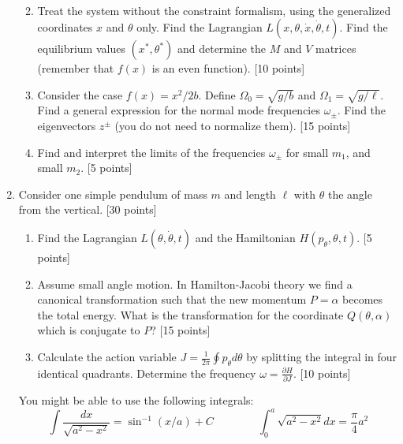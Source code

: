 \documentclass[letterpaper,11pt]{article}
\begin{document}
\begin{enumerate}
\begin{enumerate}
\begin{eqnarray*}
   \end{eqnarray*}

  \item Treat the system without the constraint formalism, using the generalized coordinates $x$ and $\theta$ only.  Find the Lagrangian $L(x,\theta,\dot{x},\dot{\theta},t)$.  Find the equilibrium values $(x^*,\theta^*)$ and determine the $M$ and $V$ matrices (remember that $f(x)$ is an even function). [10 points]
  \item Consider the case $f(x) = x^2/2b$.  Define $\Omega_0 = \sqrt{g/b}$ and $\Omega_1 = \sqrt{g/\ell}$.  Find a general expression for the normal mode frequencies $\omega_\pm$.  Find the eigenvectors $z^\pm$ (you do not need to normalize them). [15 points]
  \item Find and interpret the limits of the frequencies $\omega_\pm$ for small $m_1$, and small $m_2$. [5 points]
 \end{enumerate}
 \item \label{prob:pendulum} Consider one simple pendulum of mass $m$ and length $\ell$ with $\theta$ the angle from the vertical. [30 points]
 \begin{enumerate}
  \item Find the Lagrangian $L(\theta,\dot{\theta},t)$ and the Hamiltonian $H(p_\theta,\theta,t)$. [5 points]
  \item Assume small angle motion.  In Hamilton-Jacobi theory we find a canonical transformation such that the new momentum $P = \alpha$ becomes the total energy.  What is the transformation for the coordinate $Q(\theta,\alpha)$ which is conjugate to $P$? [15 points]
  \item Calculate the action variable $J = \frac{1}{2\pi} \oint p_\theta d\theta$ by splitting the integral in four identical quadrants.  Determine the frequency $\omega = \frac{\partial H}{\partial J}$. [10 points]
 \end{enumerate}
 You might be able to use the following integrals:
 \begin{equation*}
  \int \frac{dx}{\sqrt{a^2 - x^2}} = \sin^{-1}(x/a) + C \qquad \qquad \int_0^a \sqrt{a^2 - x^2} dx = \frac{\pi}{4}a^2
 \end{equation*}
\end{enumerate}
\end{document}
